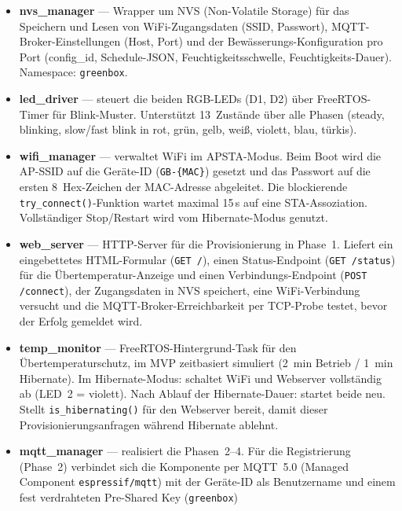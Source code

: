 \documentclass[a4paper,12pt]{article}
\begin{document}
\begin{itemize}
  \item \textbf{nvs\_manager} --- Wrapper um NVS (Non-Volatile Storage)
        für das Speichern und Lesen von WiFi-Zugangsdaten (SSID,
        Passwort), MQTT-Broker-Einstellungen (Host, Port) und der
        Bewässerungs-Konfiguration pro Port (config\_id,
        Schedule-JSON, Feuchtigkeitsschwelle, Feuchtigkeits-Dauer).
        Namespace: \texttt{greenbox}.
  \item \textbf{led\_driver} --- steuert die beiden RGB-LEDs (D1, D2)
        über FreeRTOS-Timer für Blink-Muster. Unterstützt 13~Zustände
        über alle Phasen (steady, blinking, slow/fast blink in
        rot, grün, gelb, weiß, violett, blau, türkis).
  \item \textbf{wifi\_manager} --- verwaltet WiFi im APSTA-Modus.
        Beim Boot wird die AP-SSID auf die Geräte-ID
        (\texttt{GB-\{MAC\}}) gesetzt und das Passwort auf die ersten
        8~Hex-Zeichen der MAC-Adresse abgeleitet. Die blockierende
        \texttt{try\_connect()}-Funktion wartet maximal 15\,s auf eine
        STA-Assoziation. Vollständiger Stop/Restart wird vom
        Hibernate-Modus genutzt.
  \item \textbf{web\_server} --- HTTP-Server für die Provisionierung
        in Phase~1. Liefert ein eingebettetes HTML-Formular
        (\texttt{GET /}), einen Status-Endpoint
        (\texttt{GET /status}) für die Übertemperatur-Anzeige und
        einen Verbindungs-Endpoint (\texttt{POST /connect}), der
        Zugangsdaten in NVS speichert, eine WiFi-Verbindung versucht
        und die MQTT-Broker-Erreichbarkeit per TCP-Probe testet, bevor
        der Erfolg gemeldet wird.
  \item \textbf{temp\_monitor} --- FreeRTOS-Hintergrund-Task für den
        Übertemperaturschutz, im MVP zeitbasiert simuliert
        (2~min Betrieb / 1~min Hibernate). Im Hibernate-Modus:
        schaltet WiFi und Webserver vollständig ab (LED~2 = violett).
        Nach Ablauf der Hibernate-Dauer: startet beide neu.
        Stellt \texttt{is\_hibernating()} für den Webserver bereit,
        damit dieser Provisionierungsanfragen während Hibernate
        ablehnt.
  \item \textbf{mqtt\_manager} --- realisiert die Phasen~2--4. Für die
        Registrierung (Phase~2) verbindet sich die Komponente per
        MQTT~5.0 (Managed Component \texttt{espressif/mqtt}) mit der
        Geräte-ID als Benutzername und einem fest verdrahteten
        Pre-Shared Key (\texttt{\textquotedbl greenbox\textquotedbl})

\end{itemize}
\end{document}
